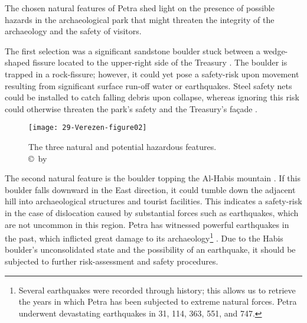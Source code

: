 The  chosen natural features of Petra shed light on the presence of possible hazards in the archaeological park that might threaten the integrity of the archaeology and the safety of visitors.

The  first selection was a significant sandstone boulder stuck between a wedge-shaped fissure located to the upper-right side of the Treasury .
The boulder is trapped in a rock-fissure; however, it could yet pose a safety-risk upon movement resulting from
significant surface run-off water or earthquakes.
Steel safety nets could be installed to catch falling debris upon collapse, whereas ignoring this risk could otherwise threaten the park’s safety and the Treasury’s façade \parencite[2617--2639]{volkwein2011}.

\begin{figure}[!htb]
	\texttt{[image: 29-Verezen-figure02]}
	\caption{The three natural and potential hazardous features.
		{\normalfont\scriptsize \\ \copyright\ by \shortauthor
	}}
	\label{fig:29-Verezen-figure02}
\end{figure}

The  second natural feature is the boulder topping the Al-Habis mountain .
If this boulder falls downward in the East direction, it could tumble down the adjacent hill into archaeological structures and
tourist facilities.
This indicates a safety-risk in the case of dislocation caused by substantial forces such as earthquakes,
which are not uncommon in this region.
Petra has witnessed powerful earthquakes in the past, which inflicted great damage to its archaeology\footnote{Several earthquakes were recorded through history; this allows us to retrieve the years in which Petra has been subjected to extreme natural forces. Petra underwent devastating earthquakes in 31\BC, 114\AD, 363\AD, 551\AD, and 747\AD \parencites[63--64]{rababeh2014}[98--103]{peterman1994}.} \parencites[126]{alshawabkehy2010}[644]{heinrichs2008}.
Due to the Habis boulder’s unconsolidated state and the possibility of an earthquake,
it should be subjected to further risk-assessment and safety procedures. 

